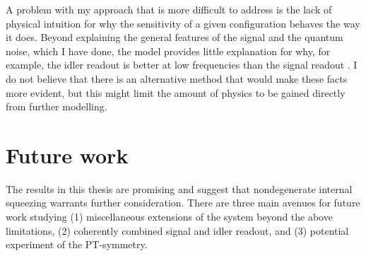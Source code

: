 A problem with my approach that is more difficult to address is the lack of physical intuition for why the sensitivity of a given configuration behaves the way it does. Beyond explaining the general features of the signal and the quantum noise, which I have done, the model provides little explanation for why, for example, the idler readout is better at low frequencies than the signal readout . I do not believe that there is an alternative method that would make these facts more evident, but this might limit the amount of physics to be gained directly from further modelling.






\section{Future work}
\label{sec:future_work}


The results in this thesis are promising and suggest that nondegenerate internal squeezing warrants further consideration. There are three main avenues for future work studying (1) miscellaneous extensions of the system beyond the above limitations, (2) coherently combined signal and idler readout, and (3) potential experiment of the PT-symmetry.

